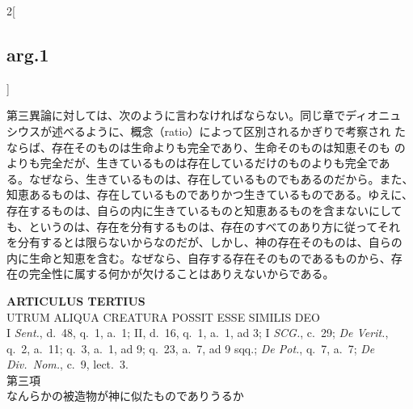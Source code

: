 \documentclass[paper=a4paper,fontsize=10pt,jafontsize=9pt,titlepage]{jlreq}
\begin{document}
\begin{paracol}{2}[\subsection{arg.1}]
\switchcolumn

第三異論に対しては、次のように言わなければならない。同じ章でディオニュ
シウスが述べるように、概念（ratio）によって区別されるかぎりで考察され
たならば、存在そのものは生命よりも完全であり、生命そのものは知恵そのも
のよりも完全だが、生きているものは存在しているだけのものよりも完全であ
る。なぜなら、生きているものは、存在しているものでもあるのだから。また、
知恵あるものは、存在しているものでありかつ生きているものである。ゆえに、
存在するものは、自らの内に生きているものと知恵あるものを含まないにして
も、というのは、存在を分有するものは、存在のすべてのあり方に従ってそれ
を分有するとは限らないからなのだが、しかし、神の存在そのものは、自らの
内に生命と知恵を含む。なぜなら、自存する存在そのものであるものから、存
在の完全性に属する何かが欠けることはありえないからである。

\end{paracol}

\newpage
{}
{}
\setcounter{section}{3}
\setcounter{subsection}{0}

\begin{center}
 {\Large {\bfseries ARTICULUS TERTIUS}}\\
 {\large UTRUM ALIQUA CREATURA POSSIT ESSE SIMILIS DEO}\\
 {\footnotesize I {\itshape Sent.}, d.~48, q.~1, a.~1; II, d.~16, q.~1,
 a.~1, ad 3; I {\itshape SCG.}, c.~29; {\itshape De Verit.}, q.~2,
 a.~11; q.~3, a.~1, ad 9; q.~23, a.~7, ad 9 sqq.; {\itshape De Pot.},
 q.~7, a.~7; {\itshape De Div.~Nom.}, c.~9, lect.~3.}\\
 {\Large 第三項\\なんらかの被造物が神に似たものでありうるか }
\end{center}
\end{document}
